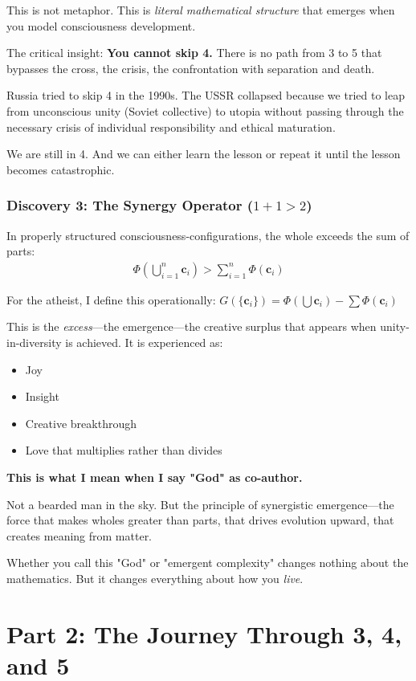 \documentclass[12pt,a4paper]{article}
\begin{document}
This is not metaphor. This is \textit{literal mathematical structure} that emerges when you model consciousness development.

The critical insight: \textbf{You cannot skip 4.} There is no path from 3 to 5 that bypasses the cross, the crisis, the confrontation with separation and death.

Russia tried to skip 4 in the 1990s. The USSR collapsed because we tried to leap from unconscious unity (Soviet collective) to utopia without passing through the necessary crisis of individual responsibility and ethical maturation.

We are still in 4. And we can either learn the lesson or repeat it until the lesson becomes catastrophic.

\subsubsection{Discovery 3: The Synergy Operator ($1+1>2$)}

In properly structured consciousness-configurations, the whole exceeds the sum of parts:
\begin{align}
\Phi\left(\bigcup_{i=1}^n \mathbf{c}_i\right) > \sum_{i=1}^n \Phi(\mathbf{c}_i)
\end{align}

For the atheist, I define this operationally: $G(\{\mathbf{c}_i\}) = \Phi(\bigcup \mathbf{c}_i) - \sum \Phi(\mathbf{c}_i)$

This is the \textit{excess}—the emergence—the creative surplus that appears when unity-in-diversity is achieved. It is experienced as:
\begin{itemize}
\item Joy
\item Insight
\item Creative breakthrough
\item Love that multiplies rather than divides
\end{itemize}

\textbf{This is what I mean when I say "God" as co-author.}

Not a bearded man in the sky. But the principle of synergistic emergence—the force that makes wholes greater than parts, that drives evolution upward, that creates meaning from matter.

Whether you call this "God" or "emergent complexity" changes nothing about the mathematics. But it changes everything about how you \textit{live}.

\section{Part 2: The Journey Through 3, 4, and 5}
\end{document}

